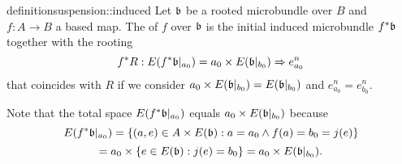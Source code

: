 \begin{mystatement}{definition}{suspension::induced}
    Let $\bb$ be a rooted microbundle over $B$ and $f: A \to B$ a based map.
    The  of $f$ over $\bb$
    is the initial induced microbundle $\ind{f}\bb$ together with the rooting
    \[
        \germdef{\ind{f}R}{E(\ind{f}\bb[a_0])
        = a_0 \cross E(\bb[b_0])}{e^n_{a_0}}
    \]
    that coincides with $R$ if we consider
    $a_0 \cross E(\bb[b_0]) = E(\bb[b_0])$ and $e^n_{a_0} = e^n_{b_0}$.
\end{mystatement}

\begin{myparagraph}
    Note that the total space $E(\ind{f}\bb[a_0])$ equals $a_0 \cross E(\bbb)$ because
    \[
        E(\ind{f}\bb[a_0])
        = \set{(a, e) \in A \cross E(\bb)}{a = a_0 \land f(a) = b_0 = j(e)}
    \]
    \[
        = a_0 \cross \set{e \in E(\bb)}{j(e) = b_0}
        = a_0 \cross E(\bbb).
    \]
\end{myparagraph}